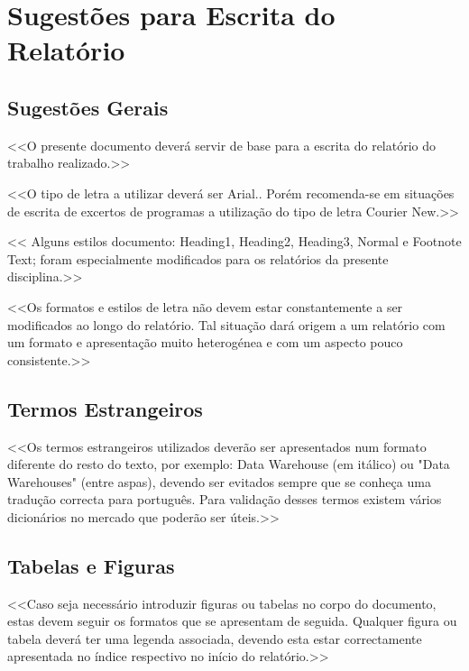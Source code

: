 
\chapter{Sugestões para Escrita do Relatório}

    \section{Sugestões Gerais}
        <<O presente documento deverá servir de base para a escrita do relatório do trabalho realizado.>>

        <<O tipo de letra a utilizar deverá ser Arial.. Porém recomenda-se em situações de escrita de excertos de programas a utilização do tipo de letra Courier New.>>

        << Alguns estilos documento: Heading1, Heading2, Heading3, Normal e Footnote Text; foram especialmente modificados para os relatórios da presente disciplina.>>

        <<Os formatos e estilos de letra não devem estar constantemente a ser modificados ao longo do relatório. Tal situação dará origem a um relatório com um formato e apresentação muito heterogénea e com um aspecto pouco consistente.>>
    \section{Termos Estrangeiros}
        <<Os termos estrangeiros utilizados deverão ser apresentados num formato diferente do resto do texto, por exemplo: Data Warehouse (em itálico) ou "Data Warehouses" (entre aspas), devendo ser evitados sempre que se conheça uma tradução correcta para português. Para validação desses termos existem vários dicionários no mercado que poderão ser úteis.>>
    \section{Tabelas e Figuras}
        <<Caso seja necessário introduzir figuras ou tabelas no corpo do documento, estas devem seguir os formatos que se apresentam de seguida. Qualquer figura ou tabela deverá ter uma legenda associada, devendo esta estar correctamente apresentada no índice respectivo no início do relatório.>>
        

